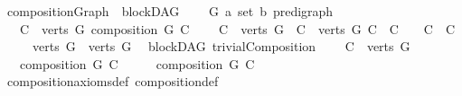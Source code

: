 \begin{isabellebody}
\isanewline
{}\isamarkupfalse%
\ compositionGraph\ {\isacharequal}{\kern0pt}\ blockDAG\ {\isacharplus}{\kern0pt}\isanewline
\ \ \ G{\isacharprime}{\kern0pt}\ {\isacharcolon}{\kern0pt}{\isacharcolon}{\kern0pt}{\isachardoublequoteopen}{\isacharparenleft}{\kern0pt}{\isacharprime}{\kern0pt}a\ set{\isacharcomma}{\kern0pt}\ {\isacharprime}{\kern0pt}b{\isacharparenright}{\kern0pt}\ pre{\isacharunderscore}{\kern0pt}digraph{\isachardoublequoteclose}\isanewline
\ \ \ {\isachardoublequoteopen}{\isasymforall}C\ {\isasymin}\ {\isacharparenleft}{\kern0pt}verts\ G{\isacharprime}{\kern0pt}{\isacharparenright}{\kern0pt}{\isachardot}{\kern0pt}\ composition\ G\ C{\isachardoublequoteclose}\isanewline
\ \ \ {\isachardoublequoteopen}{\isasymforall}\ C{}\ {\isasymin}\ {\isacharparenleft}{\kern0pt}verts\ G{\isacharprime}{\kern0pt}{\isacharparenright}{\kern0pt}{\isachardot}{\kern0pt}\ {\isasymforall}\ C{}\ {\isasymin}\ {\isacharparenleft}{\kern0pt}verts\ G{\isacharprime}{\kern0pt}{\isacharparenright}{\kern0pt}{\isachardot}{\kern0pt}\ C{}\ {\isasyminter}\ C{}\ {\isasymnoteq}\ {\isacharbraceleft}{\kern0pt}{\isacharbraceright}{\kern0pt}\ {\isasymlongrightarrow}\ C{}\ {\isacharequal}{\kern0pt}\ C{}{\isachardoublequoteclose}\isanewline
\ \ \ {\isachardoublequoteopen}\ {\isasymUnion}\ {\isacharparenleft}{\kern0pt}verts\ G{\isacharprime}{\kern0pt}{\isacharparenright}{\kern0pt}\ {\isacharequal}{\kern0pt}\ verts\ G{\isachardoublequoteclose}%
\isadelimdocument
%
\endisadelimdocument
%
\isatagdocument
%
\isamarkuptrue%
%
\isamarkuptrue%
%
\endisatagdocument
{\isafolddocument}%
%
\isadelimdocument
%
\endisadelimdocument
{}\isamarkupfalse%
\ {\isacharparenleft}{\kern0pt}\ blockDAG{\isacharparenright}{\kern0pt}\ trivialComposition{\isacharcolon}{\kern0pt}\ \isanewline
\ \ \ {\isachardoublequoteopen}C\ {\isacharequal}{\kern0pt}\ verts\ G{\isachardoublequoteclose}\isanewline
\ \ \ {\isachardoublequoteopen}composition\ G\ C{\isachardoublequoteclose}\isanewline
%
\isadelimproof
%
\endisadelimproof
%
\isatagproof
{}\isamarkupfalse%
\ {\isacharminus}{\kern0pt}\isanewline
\ \ \isamarkupfalse%
\ {\isachardoublequoteopen}composition\ G\ C{\isachardoublequoteclose}\isanewline
\ \ \ \ \isamarkupfalse%
\ composition{\isacharunderscore}{\kern0pt}axioms{\isacharunderscore}{\kern0pt}def\ composition{\isacharunderscore}{\kern0pt}def\isanewline

\end{isabellebody}
